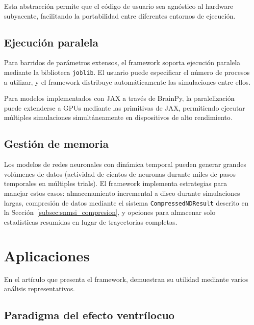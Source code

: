 Esta abstracción permite que el código de usuario sea agnóstico al hardware subyacente, facilitando la portabilidad entre diferentes entornos de ejecución.

\subsection{Ejecución paralela}
\label{subsec:snmsi_paralelo}

Para barridos de parámetros extensos, el framework soporta ejecución paralela mediante la biblioteca \texttt{joblib}. El usuario puede especificar el número de procesos a utilizar, y el framework distribuye automáticamente las simulaciones entre ellos.

Para modelos implementados con JAX a través de BrainPy, la paralelización puede extenderse a GPUs mediante las primitivas de JAX, permitiendo ejecutar múltiples simulaciones simultáneamente en dispositivos de alto rendimiento.

\subsection{Gestión de memoria}
\label{subsec:snmsi_memoria}

Los modelos de redes neuronales con dinámica temporal pueden generar grandes volúmenes de datos (actividad de cientos de neuronas durante miles de pasos temporales en múltiples trials). El framework implementa estrategias para manejar estos casos: almacenamiento incremental a disco durante simulaciones largas, compresión de datos mediante el sistema \texttt{CompressedNDResult} descrito en la Sección~\ref{subsec:snmsi_compresion}, y opciones para almacenar solo estadísticas resumidas en lugar de trayectorias completas.


\section{Aplicaciones}
\label{sec:snmsi_aplicaciones}

En el artículo que presenta el framework, \citet{paredes2025scikit} demuestran su utilidad mediante varios análisis representativos.

\subsection{Paradigma del efecto ventrílocuo}
\label{subsec:snmsi_ventrilocuo}

